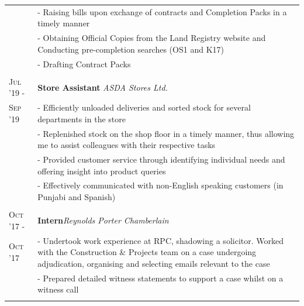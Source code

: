 \documentclass[a4paper,10pt]{extarticle} %
\begin{document}
{\begin{tabularx}{\linewidth}{ l | X }
& {- Raising bills upon exchange of contracts and Completion Packs in a timely manner}\\

& {- Obtaining Official Copies from the Land Registry website and Conducting pre-completion searches (OS1 and K17)}\\

& {- Drafting Contract Packs}\\
\multicolumn{1}{c}{} \\


\textsc{Jul '19 -} & \textbf{Store Assistant} \hfill\textit{ASDA Stores Ltd.}\\
\textsc{Sep '19}& {- Efficiently unloaded deliveries and sorted stock for several departments in the store}\\

& {- Replenished stock on the shop floor in a timely manner, thus allowing me to assist colleagues with their respective tasks}\\

& {- Provided customer service through identifying individual needs and offering insight into product queries}\\

& {- Effectively communicated with non-English speaking customers (in Punjabi and Spanish)}\\
\multicolumn{1}{c}{} \\

\textsc{Oct '17 -} & \textbf{Intern}\hfill\textit{Reynolds Porter Chamberlain}\\
\textsc{Oct '17}& {- Undertook work experience at RPC, shadowing a solicitor. Worked with the Construction \& Projects team on a case undergoing adjudication, organising and selecting emails relevant to the case}\\

& {- Prepared detailed witness statements to support a case whilst on a witness call}\\

\multicolumn{1}{c}{} \\


\end{tabularx}}
\end{document}
